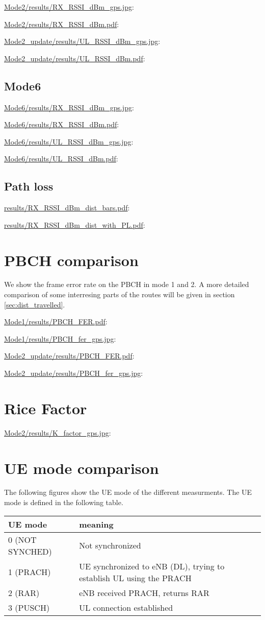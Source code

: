 \documentclass[a4paper,10pt]{article}
\newcommand{\printfile}[2][]{
 \begin{minipage}{8cm}
  \centering
  \url{#2}: #1

 \end{minipage}
}
\begin{document}
\printfile{Mode2/results/RX_RSSI_dBm_gps.jpg}
\printfile{Mode2/results/RX_RSSI_dBm.pdf}

\printfile{Mode2_update/results/UL_RSSI_dBm_gps.jpg}
\printfile{Mode2_update/results/UL_RSSI_dBm.pdf}

\subsection{Mode6}
\printfile{Mode6/results/RX_RSSI_dBm_gps.jpg}
\printfile{Mode6/results/RX_RSSI_dBm.pdf}

\printfile{Mode6/results/UL_RSSI_dBm_gps.jpg}
\printfile{Mode6/results/UL_RSSI_dBm.pdf}

\subsection{Path loss}
\printfile{results/RX_RSSI_dBm_dist_bars.pdf}
\printfile{results/RX_RSSI_dBm_dist_with_PL.pdf}


\section{PBCH comparison}
We show the frame error rate on the PBCH in mode 1 and 2. A more detailed comparison of some interresing parts of the routes will be given in section \ref{sec:dist_travelled}.

\printfile{Mode1/results/PBCH_FER.pdf}
\printfile{Mode1/results/PBCH_fer_gps.jpg}

\printfile{Mode2_update/results/PBCH_FER.pdf}
\printfile{Mode2_update/results/PBCH_fer_gps.jpg}

\section{Rice Factor}

\printfile{Mode2/results/K_factor_gps.jpg}

\section{UE mode comparison}
The following figures show the UE mode of the different measurments. The UE mode is defined in the following table.

\begin{center}
\begin{tabular}{l|p{6cm}}
UE mode & meaning \\ 
\hline
0 (NOT SYNCHED) & Not synchronized \\ 
1 (PRACH) & UE synchronized to eNB (DL), trying to establish UL using the PRACH\\ 
2 (RAR) & eNB received PRACH, returns RAR \\ 
3 (PUSCH) & UL connection established
\end{tabular}
\end{center}
\end{document}
